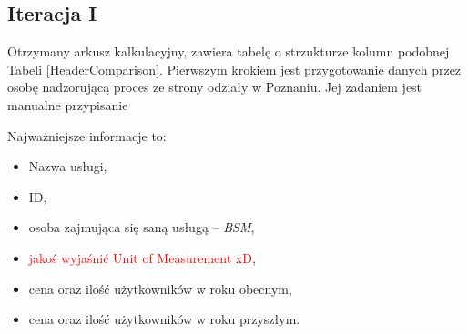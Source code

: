 \subsection{Iteracja I}
Otrzymany arkusz kalkulacyjny, zawiera tabelę o strzukturze kolumn podobnej Tabeli \ref{HeaderComparison}. Pierwszym krokiem jest przygotowanie danych przez osobę nadzorującą proces ze strony odziały w Poznaniu. Jej zadaniem jest manualne przypisanie 

\renewcommand{\arraystretch}{1.1} %
\begin{table}[t] %
    \begin{adjustwidth}{-50pt}{-20pt}
    \centering
    \caption{Nagłówki kolumn z arkusza kalkulacyjnego z roku}
    \label{HeaderComparison}
    \end{adjustwidth}
\end{table}

Najważniejsze informacje to:
\begin{itemize}
\item Nazwa usługi,
\item ID,
\item osoba zajmująca się saną usługą -- \emph{BSM},
\item \textcolor{red}{jakoś wyjaśnić Unit of Measurement xD},
\item cena oraz ilość użytkowników w roku obecnym,
\item cena oraz ilość użytkowników w roku przyszłym.
\end{itemize}







